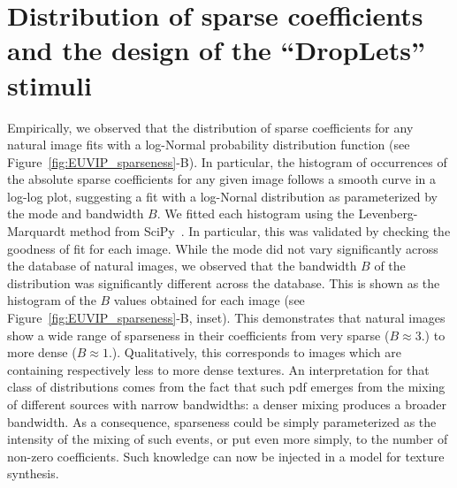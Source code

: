 \documentclass[a4paper, 10pt, twocolumns]{article}
\begin{document}
\section{Distribution of sparse coefficients and the design of the ``DropLets'' stimuli}
Empirically, we observed that the distribution of sparse coefficients for any natural image fits with a log-Normal probability distribution function (see Figure~\ref{fig:EUVIP_sparseness}-B). In particular, the histogram of occurrences of the absolute sparse coefficients for any given image follows a smooth curve in a log-log plot, suggesting a fit with a log-Nornal distribution as parameterized by the mode and bandwidth $B$. We fitted each histogram using the Levenberg-Marquardt method from SciPy~\citep{Oliphant07}. In particular, this was validated by checking the goodness of fit for each image. While the mode did not vary significantly across the database of natural images, we observed that the bandwidth $B$ of the distribution was significantly different across the database. This is shown as the histogram of the $B$ values obtained for each image (see Figure~\ref{fig:EUVIP_sparseness}-B, inset). This demonstrates that natural images show a wide range of sparseness in their coefficients from very sparse ($B\approx 3.$) to more dense ($B\approx 1.$). Qualitatively, this corresponds to images which are containing respectively less to more dense textures. An interpretation for that class of distributions comes from the fact that such pdf emerges from the mixing of different sources with narrow bandwidths: a denser mixing produces a broader bandwidth. As a consequence, sparseness could be simply parameterized as the intensity of the mixing of such events, or put even more simply, to the number of non-zero coefficients. Such knowledge can now be injected in a model for texture synthesis.
\end{document}
